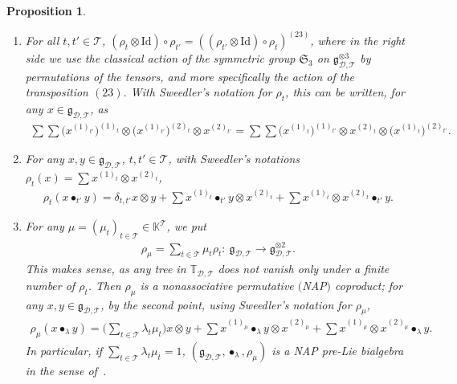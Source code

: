 \documentclass[10pt,a4paper]{amsart}
\numberwithin{equation}{section}
\newtheorem{Proposition}[Theorem]{Proposition}
 { \theoremstyle{definition}
\newtheorem{Definition}[Theorem]{Definition}
\newtheorem{Note}[Theorem]{Note}
\newtheorem{Example}[Theorem]{Example}
\newtheorem{Remark}[Theorem]{Remark}
\newtheorem{Notation}[Theorem]{Notation}}
\newcommand{\K}{\mathbb{K}}
\newcommand{\T}{\mathcal{T}}
\newcommand{\D}{\mathcal{D}}
\newcommand{\g}{\mathfrak{g}}
\newcommand{\bfT}{\mathbb{T}}
\newcommand{\id}{\mathrm{Id}}
\begin{document}
\begin{Proposition} \label{prop14}\qquad

\begin{enumerate}\itemsep=0pt
\item[$1.$] For all $t,t'\in \T$, $(\rho_t\otimes \id)\circ \rho_{t'}=((\rho_{t'}\otimes \id)\circ \rho_t)^{(23)}$,
where in the right side we use the classical action of the symmetric group $\mathfrak{S}_3$ on $\g_{\D,\T}^{\otimes 3}$
by permutations of the tensors, and more specifically the action of the transposition $(23)$. With Sweedler's notation for
$\rho_t$, this can be written, for any $x\in \g_{\D,\T}$, as
\begin{gather*}
\sum\sum \big(x^{(1)_{t'}}\big)^{(1)_t}\otimes \big(x^{(1)_{t'}}\big)^{(2)_t} \otimes x^{(2)_{t'}}
=\sum\sum \big(x^{(1)_t}\big)^{(1)_{t'}}\otimes x^{(2)_t}\otimes \big(x^{(1)_t}\big)^{(2)_{t'}}.
\end{gather*}

\item[$2.$] For any $x,y\in \g_{\D,\T}$, $t,t'\in \T$, with Sweedler's notations
$\rho_t(x)=\sum x^{(1)_t}\otimes x^{(2)_t}$,
\begin{gather*}
\rho_t(x\bullet_{t'} y)=\delta_{t,t'} x\otimes y+\sum x^{(1)_t}\bullet_{t'} y\otimes x^{(2)_t}
+\sum x^{(1)_t}\otimes x^{(2)_t}\bullet_{t'} y.
\end{gather*}

\item[$3.$] For any $\mu=(\mu_t)_{t\in \T}\in \K^\T$, we put
\begin{gather*}
\rho_\mu=\sum_{t\in \T} \mu_t \rho_t\colon\ \g_{\D,\T}\longrightarrow \g_{\D,\T}^{\otimes 2}.
\end{gather*}
This makes sense, as any tree in $\bfT_{\D,\T}$ does not vanish only under a finite number of $\rho_t$.
Then $\rho_\mu$ is a nonassociative permutative $($NAP$)$ coproduct;
for any $x,y\in \g_{\D,\T}$, by the second point, using Sweedler's notation for $\rho_\mu$,
\begin{gather*}
\rho_\mu(x\bullet_\lambda y)=\bigg(\sum_{t\in \T} \lambda_t\mu_t\bigg) x\otimes y
+\sum x^{(1)_\mu}\bullet_\lambda y\otimes x^{(2)_\mu}
+\sum x^{(1)_\mu}\otimes x^{(2)_\mu}\bullet_\lambda y.
\end{gather*}
In particular, if $\sum_{t\in \T} \lambda_t\mu_t=1$,
$(\g_{\D,\T},\bullet_\lambda,\rho_\mu)$ is a NAP pre-Lie bialgebra in the sense of~{\rm\cite{Livernet}}.
\end{enumerate}
\end{Proposition}
\end{document}
